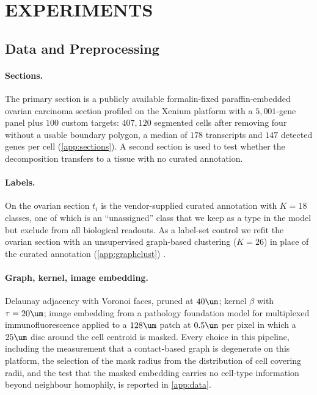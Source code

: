 \section{EXPERIMENTS}
\label{sec:experiments}


\subsection{Data and Preprocessing}
\label{sec:data}

\paragraph{Sections.}
The primary section is a publicly available formalin-fixed paraffin-embedded ovarian carcinoma section profiled on the Xenium platform \needsource with a $5{,}001$-gene panel plus $100$ custom targets: $407{,}120$ segmented cells after removing four without a usable boundary polygon, a median of $178$ transcripts and $147$ detected genes per cell (\cref{app:sections}). A second section  is used to test whether the decomposition transfers to a tissue with no curated annotation.

\paragraph{Labels.}
On the ovarian section $t_i$ is the vendor-supplied curated annotation with $K = 18$ classes, one of which is an ``unassigned'' class that we keep as a type in the model but exclude from all biological readouts. As a label-set control we refit the ovarian section with an unsupervised graph-based clustering ($K = 26$) in place of the curated annotation (\cref{app:graphclust}) .

\paragraph{Graph, kernel, image embedding.}
Delaunay adjacency with Voronoi faces, pruned at $40\um$; kernel $\beta$ with $\tau = 20\um$; image embedding from a pathology foundation model for multiplexed immunofluorescence \citep{kronos2025} applied to a $128\um$ patch at $0.5\um$ per pixel in which a $25\um$ disc around the cell centroid is masked. Every choice in this pipeline, including the measurement that a contact-based graph is degenerate on this platform, the selection of the mask radius from the distribution of cell covering radii, and the test that the masked embedding carries no cell-type information beyond neighbour homophily, is reported in \cref{app:data}.

